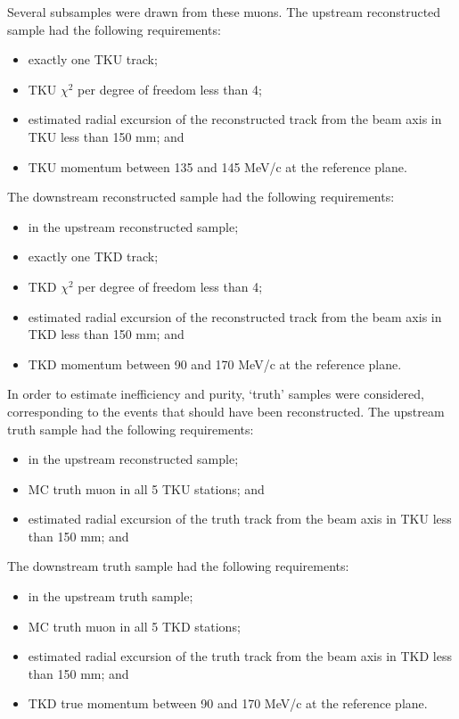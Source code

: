 Several subsamples were drawn from these muons. The upstream reconstructed 
sample had the following requirements:
\begin{itemize}
\item exactly one TKU track;
\item TKU $\chi^2$ per degree of freedom less than 4;
\item estimated radial excursion of the reconstructed track from the beam axis 
in TKU less than 150 mm; and
\item TKU momentum between 135 and 145 MeV/c at the reference plane.
\end{itemize}
The downstream reconstructed sample had the following requirements:
\begin{itemize}
\item in the upstream reconstructed sample;
\item exactly one TKD track;
\item TKD $\chi^2$ per degree of freedom less than 4;
\item estimated radial excursion of the reconstructed track from the beam axis 
in TKD less than 150 mm; and
\item TKD momentum between 90 and 170 MeV/c at the reference plane.
\end{itemize}

In order to estimate inefficiency and purity, `truth' samples were considered,
corresponding to the events that should have been reconstructed. The upstream 
truth sample had the following requirements:
\begin{itemize}
\item in the upstream reconstructed sample;
\item MC truth muon in all 5 TKU stations; and
\item estimated radial excursion of the truth track from the beam axis in TKU 
less than 150 mm; and
\end{itemize}
The downstream truth sample had the following requirements:
\begin{itemize}
\item in the upstream truth sample;
\item MC truth muon in all 5 TKD stations;
\item estimated radial excursion of the truth track from the beam axis in TKD 
less than 150 mm; and
\item TKD true momentum between 90 and 170 MeV/c at the reference plane.
\end{itemize}

